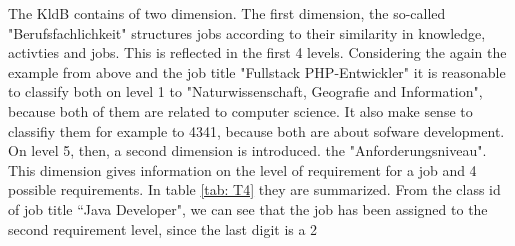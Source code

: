 \documentclass[12pt, a4paper, titlepage]{article}
\begin{document}
The \ac{KldB} contains of two dimension. The first dimension, the so-called "Berufsfachlichkeit" structures jobs according to their similarity in knowledge, activties and jobs. This is reflected in the first 4 levels. Considering the again the example from above and the job title "Fullstack PHP-Entwickler" it is reasonable to classify both on level 1 to "Naturwissenschaft, Geografie and Information", because both of them are related to computer science. It also make sense to classifiy them for example to 4341, because both are about sofware development. On level 5, then, a second dimension is introduced. the "Anforderungsniveau". This dimension gives information on the level of requirement for a job and 4 possible requirements. In table \ref{tab: T4} they are summarized. From the class id of job title ``Java Developer", we can see that the job has been assigned to the second requirement level, since the last digit is a 2 \citep{Bundesagentur2011a,Bundesagentur2011b,Paulus2013}


\begin{table}[]
  \caption{\label{tab: T3} Overview of classes Level 1 - Berufsbereiche (edited after \citep{Bundesagentur2011b})}
  \end{table}
\end{document}
